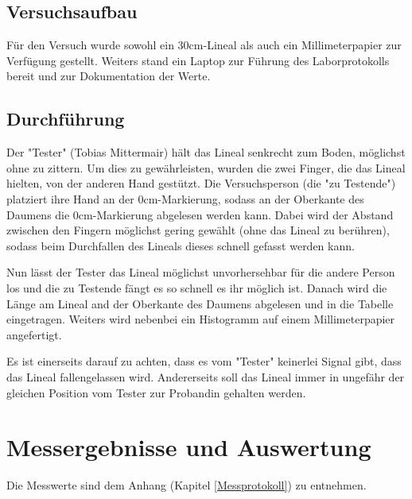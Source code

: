 \documentclass[a4paper,12pt]{article}
\begin{document}
\subsection{Versuchsaufbau}


Für den Versuch wurde sowohl ein 30cm-Lineal als auch ein Millimeterpapier zur Verfügung gestellt. Weiters stand ein 
Laptop zur Führung des Laborprotokolls bereit und zur Dokumentation der Werte.

\subsection{Durchführung}

Der "Tester" (Tobias Mittermair) hält das Lineal senkrecht zum
Boden, möglichst ohne zu zittern. Um dies zu gewährleisten, wurden die zwei Finger, die das Lineal hielten, von 
der anderen Hand gestützt. Die Versuchsperson (die "zu
Testende") platziert ihre Hand an der 0cm-Markierung, sodass an der Oberkante des Daumens die 0cm-Markierung 
abgelesen werden kann. Dabei wird der Abstand zwischen den Fingern möglichst gering gewählt (ohne das Lineal zu 
berühren), sodass beim Durchfallen des Lineals dieses schnell gefasst werden kann.

Nun lässt der Tester das Lineal möglichst unvorhersehbar für die andere Person los und die zu Testende fängt es 
so schnell es ihr möglich ist.
Danach wird die Länge am Lineal and der Oberkante des Daumens abgelesen und in
die Tabelle eingetragen. Weiters wird nebenbei ein Histogramm auf einem Millimeterpapier
angefertigt.

Es ist einerseits darauf zu achten, dass es vom "Tester" keinerlei Signal gibt, dass das Lineal
fallengelassen wird. Andererseits soll das Lineal immer in ungefähr der gleichen Position vom Tester zur Probandin
gehalten werden.

\section{Messergebnisse und Auswertung}

Die Messwerte sind dem Anhang (Kapitel \ref{Messprotokoll}) zu entnehmen. 
\end{document}
